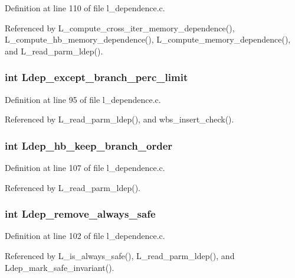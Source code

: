 Definition at line 110 of file l\_\-dependence.c.

Referenced by L\_\-compute\_\-cross\_\-iter\_\-memory\_\-dependence(), L\_\-compute\_\-hb\_\-memory\_\-dependence(), L\_\-compute\_\-memory\_\-dependence(), and L\_\-read\_\-parm\_\-ldep().
\subsubsection{\setlength{\rightskip}{0pt plus 5cm}int \bf{Ldep\_\-except\_\-branch\_\-perc\_\-limit}}\label{l__dependence_8h_3cdce7c77b5936041aed79ecfe9e127c}




Definition at line 95 of file l\_\-dependence.c.

Referenced by L\_\-read\_\-parm\_\-ldep(), and wbs\_\-insert\_\-check().
\subsubsection{\setlength{\rightskip}{0pt plus 5cm}int \bf{Ldep\_\-hb\_\-keep\_\-branch\_\-order}}\label{l__dependence_8h_81b3d1e55c5b2f515229d08e9ccf386d}




Definition at line 107 of file l\_\-dependence.c.

Referenced by L\_\-read\_\-parm\_\-ldep().
\subsubsection{\setlength{\rightskip}{0pt plus 5cm}int \bf{Ldep\_\-remove\_\-always\_\-safe}}\label{l__dependence_8h_2f68c5b3a4589bab5b453dabe4ae7a4a}




Definition at line 102 of file l\_\-dependence.c.

Referenced by L\_\-is\_\-always\_\-safe(), L\_\-read\_\-parm\_\-ldep(), and Ldep\_\-mark\_\-safe\_\-invariant().
